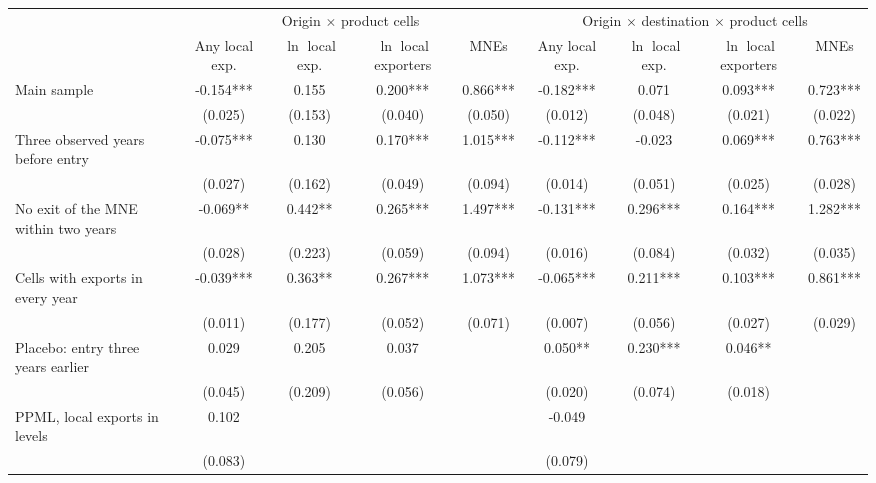 \begin{tabular}{l*{8}{c}}
\toprule
 & \multicolumn{4}{c}{Origin $\times$ product cells} & \multicolumn{4}{c}{Origin $\times$ destination $\times$ product cells} \\
\cmidrule(lr){2-5}\cmidrule(lr){6-9}
 & Any local exp. & $\ln$ local exp. & $\ln$ local exporters & MNEs & Any local exp. & $\ln$ local exp. & $\ln$ local exporters & MNEs \\
\midrule
Main sample & -0.154*** & 0.155 & 0.200*** & 0.866*** & -0.182*** & 0.071 & 0.093*** & 0.723*** \\
 & (0.025) & (0.153) & (0.040) & (0.050) & (0.012) & (0.048) & (0.021) & (0.022) \\
Three observed years before entry & -0.075*** & 0.130 & 0.170*** & 1.015*** & -0.112*** & -0.023 & 0.069*** & 0.763*** \\
 & (0.027) & (0.162) & (0.049) & (0.094) & (0.014) & (0.051) & (0.025) & (0.028) \\
No exit of the MNE within two years & -0.069** & 0.442** & 0.265*** & 1.497*** & -0.131*** & 0.296*** & 0.164*** & 1.282*** \\
 & (0.028) & (0.223) & (0.059) & (0.094) & (0.016) & (0.084) & (0.032) & (0.035) \\
Cells with exports in every year & -0.039*** & 0.363** & 0.267*** & 1.073*** & -0.065*** & 0.211*** & 0.103*** & 0.861*** \\
 & (0.011) & (0.177) & (0.052) & (0.071) & (0.007) & (0.056) & (0.027) & (0.029) \\
Placebo: entry three years earlier & 0.029 & 0.205 & 0.037 &  & 0.050** & 0.230*** & 0.046** &  \\
 & (0.045) & (0.209) & (0.056) &  & (0.020) & (0.074) & (0.018) &  \\
PPML, local exports in levels & 0.102 &  &  &  & -0.049 &  &  &  \\
 & (0.083) &  &  &  & (0.079) &  &  &  \\
\bottomrule
\end{tabular}
